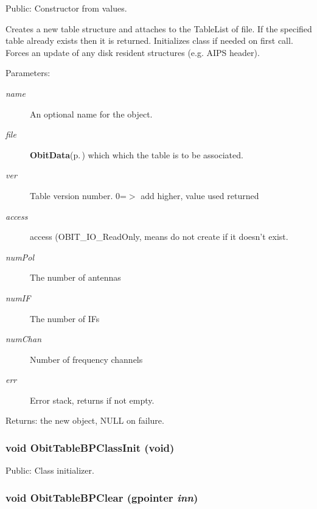 Public: Constructor from values. 

Creates a new table structure and attaches to the Table\-List of file. If the specified table already exists then it is returned. Initializes class if needed on first call. Forces an update of any disk resident structures (e.g. AIPS header). \begin{Desc}
\item[Parameters:]
\begin{description}
\item[{\em name}]An optional name for the object. \item[{\em file}]{\bf Obit\-Data}{\rm (p.\,\pageref{structObitData})} which which the table is to be associated. \item[{\em ver}]Table version number. 0=$>$ add higher, value used returned \item[{\em access}]access (OBIT\_\-IO\_\-Read\-Only, means do not create if it doesn't exist. \item[{\em num\-Pol}]The number of antennas \item[{\em num\-IF}]The number of IFs \item[{\em num\-Chan}]Number of frequency channels \item[{\em err}]Error stack, returns if not empty. \end{description}
\end{Desc}
\begin{Desc}
\item[Returns:]the new object, NULL on failure. \end{Desc}
\subsubsection{\setlength{\rightskip}{0pt plus 5cm}void Obit\-Table\-BPClass\-Init (void)}\label{ObitTableBP_8c_a27}


Public: Class initializer. 

\subsubsection{\setlength{\rightskip}{0pt plus 5cm}void Obit\-Table\-BPClear (gpointer {\em inn})}\label{ObitTableBP_8c_a9}


